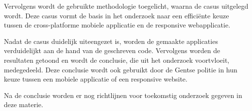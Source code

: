 Vervolgens wordt de gebruikte methodologie toegelicht, waarna de casus uitgelegd wordt.
Deze casus vormt de basis in het onderzoek naar een efficiënte keuze tussen de
cross-platforme mobiele applicatie en de responsive webapplicatie.

Nadat de casus duidelijk uiteengezet is, worden de gemaakte applicaties verduidelijkt aan de hand van de geschreven code.
Vervolgens worden de resultaten getoond en wordt de conclusie, die uit het onderzoek voortvloeit, medegedeeld.
Deze conclusie wordt ook gebruikt door de Gentse politie in hun keuze tussen een mobiele applicatie of een responsive website.

Na de conclusie worden er nog richtlijnen voor toekomstig onderzoek gegeven in deze materie.

